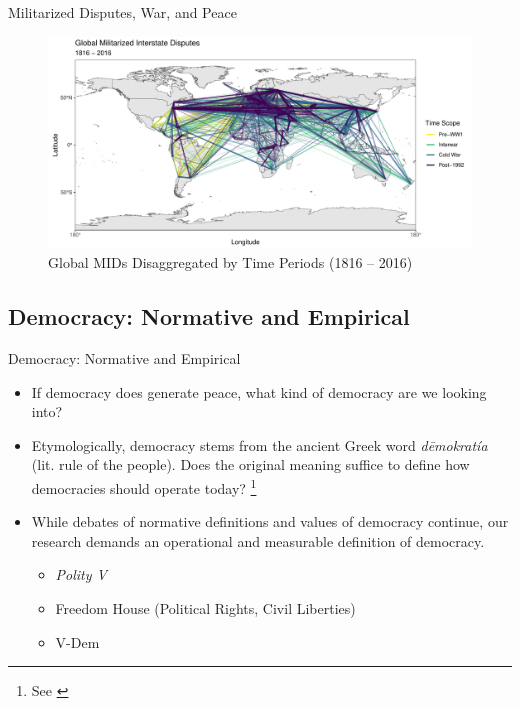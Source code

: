 \documentclass{beamer}
\begin{document}
	\begin{frame}{Militarized Disputes, War, and Peace}
		\begin{figure}
			\includegraphics[width=\linewidth]{data/output/plots/all.pdf}
			\caption{Global MIDs Disaggregated by Time Periods (1816 -- 2016)}
		\end{figure}
	\end{frame}
	
	\subsection{Democracy: Normative and Empirical}
	
	\begin{frame}{Democracy: Normative and Empirical}
		\begin{itemize}
			\item If democracy does generate peace, what kind of democracy are we looking into?
			\item Etymologically, democracy stems from the ancient Greek word \textit{dēmokratía} (lit. rule of the people). Does the original meaning suffice to define how democracies should operate today? \footnote{See \cite{sartoriTheoryDemocracyRevisited1987}}
			\item While debates of normative definitions and values of democracy continue, our research demands an operational and measurable definition of democracy.
			\begin{itemize}
				\item \textit{Polity V}
				\item Freedom House (Political Rights, Civil Liberties)
				\item V-Dem
			\end{itemize}
		\end{itemize}
	\end{frame}
\end{document}
